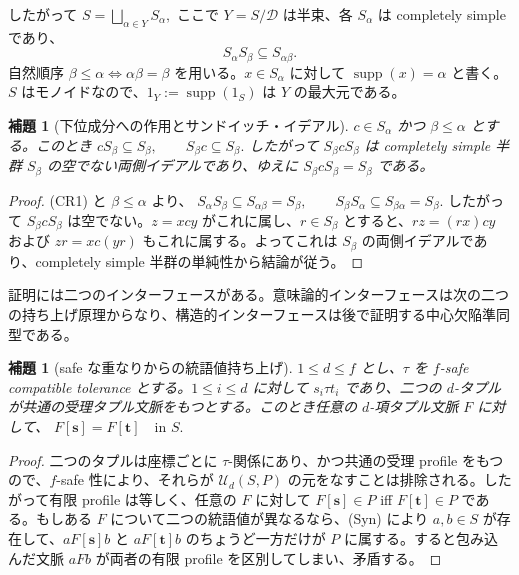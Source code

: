 \documentclass[10pt,a4paper]{ltjsarticle}
\newtheorem{lemma}[theorem]{補題}
\theoremstyle{definition}
\theoremstyle{remark}
\begin{document}
したがって
\(S=\bigsqcup_{\alpha\in Y}S_\alpha,\)
ここで $Y=S/\mathcal D$ は半束、各 $S_\alpha$ は completely simple であり、
\[
S_\alpha S_\beta\subseteq S_{\alpha\beta}.
\tag{CR1}
\]
自然順序
\(\beta\le\alpha \Longleftrightarrow \alpha\beta=\beta\)
を用いる。$x\in S_\alpha$ に対して $\operatorname{supp}(x)=\alpha$ と書く。$S$ はモノイドなので、$1_Y:=\operatorname{supp}(1_S)$ は $Y$ の最大元である。

\begin{lemma}[下位成分への作用とサンドイッチ・イデアル]
\label{cr:lem:sandwich-ideal}
\(c\in S_\alpha\) かつ \(\beta\le\alpha\) とする。このとき
\(
cS_\beta\subseteq S_\beta,
\qquad
S_\beta c\subseteq S_\beta.
\)
したがって \(S_\beta c S_\beta\) は completely simple 半群 \(S_\beta\) の空でない両側イデアルであり、ゆえに
\(S_\beta c S_\beta=S_\beta\)
である。
\end{lemma}

\begin{proof}
\textup{(CR1)} と \(\beta\le\alpha\) より、
\(
S_\alpha S_\beta\subseteq S_{\alpha\beta}=S_\beta,
\qquad
S_\beta S_\alpha\subseteq S_{\beta\alpha}=S_\beta.
\)
したがって \(S_\beta cS_\beta\) は空でない。$z=xcy$ がこれに属し、$r\in S_\beta$ とすると、$rz=(rx)cy$ および $zr=xc(yr)$ もこれに属する。よってこれは $S_\beta$ の両側イデアルであり、completely simple 半群の単純性から結論が従う。
\end{proof}

証明には二つのインターフェースがある。意味論的インターフェースは次の二つの持ち上げ原理からなり、構造的インターフェースは後で証明する中心欠陥準同型である。

\begin{lemma}[safe な重なりからの統語値持ち上げ]
\label{cr:lem:syntactic-lifting}
$1\le d\le f$ とし、$\tau$ を $f$-safe compatible tolerance とする。$1\le i\le d$ に対して $s_i\tau t_i$ であり、二つの $d$-タプルが共通の受理タプル文脈をもつとする。このとき任意の $d$-項タプル文脈 $F$ に対して、
\(F[\mathbf s]=F[\mathbf t]\quad\text{in }S.\)
\end{lemma}

\begin{proof}
二つのタプルは座標ごとに $\tau$-関係にあり、かつ共通の受理 profile をもつので、$f$-safe 性により、それらが $\mathcal U_d(S,P)$ の元をなすことは排除される。したがって有限 profile は等しく、任意の $F$ に対して $F[\mathbf s]\in P$ iff $F[\mathbf t]\in P$ である。もしある $F$ について二つの統語値が異なるなら、\textup{(Syn)} により $a,b\in S$ が存在して、$aF[\mathbf s]b$ と $aF[\mathbf t]b$ のちょうど一方だけが $P$ に属する。すると包み込んだ文脈 $aFb$ が両者の有限 profile を区別してしまい、矛盾する。
\end{proof}
\end{document}
